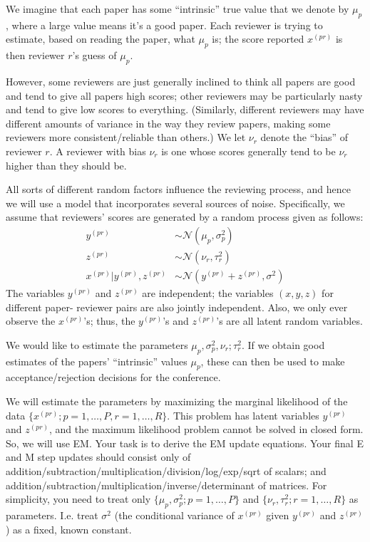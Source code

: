 \documentclass{article}
\theoremstyle{definition}
\theoremstyle{definition}
\theoremstyle{remark}
\begin{document}
We imagine that each paper has some ``intrinsic'' true value that we denote by $\mu_p$, where a
large value means it's a good paper. Each reviewer is trying to estimate, based on reading
the paper, what $\mu_p$ is; the score reported $x^{(pr)}$ is then reviewer $r$'s guess of $\mu_p$.

However, some reviewers are just generally inclined to think all papers are good and tend
to give all papers high scores; other reviewers may be particularly nasty and tend to give
low scores to everything. (Similarly, different reviewers may have different amounts of
variance in the way they review papers, making some reviewers more consistent/reliable
than others.) We let $\nu_r$ denote the ``bias'' of reviewer $r$. A reviewer with bias $\nu_r$ is one
whose scores generally tend to be $\nu_r$ higher than they should be.

All sorts of different random factors influence the reviewing process, and hence we will use
a model that incorporates several sources of noise. Specifically, we assume that reviewers'
scores are generated by a random process given as follows:
\begin{equation}
  \begin{aligned}
  y^{(pr)} &\sim \mathcal{N}(\mu_p, \sigma_p^2) \\
  z^{(pr)} &\sim \mathcal{N}(\nu_r, \tau_r^2) \\
  x^{(pr)} |y^{(pr)}, z^{(pr)} &\sim \mathcal{N}(y^{(pr)} + z^{(pr)}, \sigma^2)
  \end{aligned}
\end{equation}
The variables $y^{(pr)}$ and $z^{(pr)}$ are independent; the variables $(x, y, z)$ for different paper-
reviewer pairs are also jointly independent. Also, we only ever observe the $x^{(pr)}$'s; thus,
the $y^{(pr)}$'s and $z^{(pr)}$'s are all latent random variables.

We would like to estimate the parameters $\mu_p, \sigma_p^2, \nu_r; \tau_r^2$. If we obtain good estimates of
the papers' ``intrinsic'' values $\mu_p$, these can then be used to make acceptance/rejection
decisions for the conference.

We will estimate the parameters by maximizing the marginal likelihood of the data $\{x^{(pr)}; p =
1, \ldots, P, r = 1, \ldots, R\}$. This problem has latent variables $y^{(pr)}$ and $z^{(pr)}$, and the maximum likelihood problem cannot be solved in closed form. So, we will use EM. Your
task is to derive the EM update equations. Your final E and M step updates should
consist only of addition/subtraction/multiplication/division/log/exp/sqrt of scalars; and
addition/subtraction/multiplication/inverse/determinant of matrices. For simplicity, you
need to treat only $\{\mu_p, \sigma_p^2; p = 1, \ldots, P\}$ and $\{\nu_r, \tau_r^2; r = 1, \ldots, R\}$ as parameters. I.e. treat
$\sigma^2$ (the conditional variance of $x^{(pr)}$ given $y^{(pr)}$ and $z^{(pr)}$) as a fixed, known constant.
\end{document}
